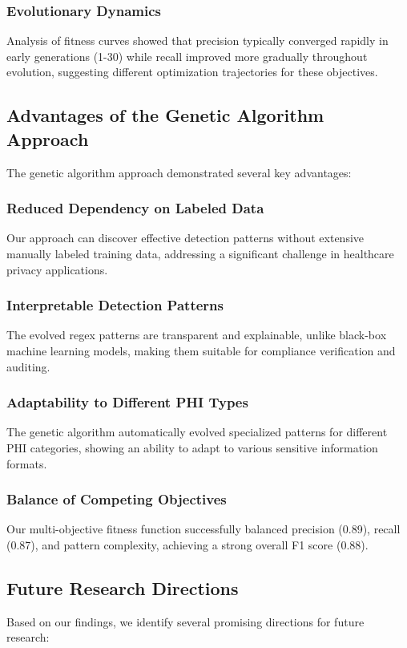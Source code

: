 \documentclass[conference]{IEEEtran}
\begin{document}
\subsubsection{Evolutionary Dynamics} Analysis of fitness curves showed that precision typically converged rapidly in early generations (1-30) while recall improved more gradually throughout evolution, suggesting different optimization trajectories for these objectives.

\subsection{\textbf{Advantages of the Genetic Algorithm Approach}}

The genetic algorithm approach demonstrated several key advantages:

\subsubsection{Reduced Dependency on Labeled Data} Our approach can discover effective detection patterns without extensive manually labeled training data, addressing a significant challenge in healthcare privacy applications.

\subsubsection{Interpretable Detection Patterns} The evolved regex patterns are transparent and explainable, unlike black-box machine learning models, making them suitable for compliance verification and auditing.

\subsubsection{Adaptability to Different PHI Types} The genetic algorithm automatically evolved specialized patterns for different PHI categories, showing an ability to adapt to various sensitive information formats.

\subsubsection{Balance of Competing Objectives} Our multi-objective fitness function successfully balanced precision (0.89), recall (0.87), and pattern complexity, achieving a strong overall F1 score (0.88).

\subsection{\textbf{Future Research Directions}}
Based on our findings, we identify several promising directions for future research:
\end{document}
